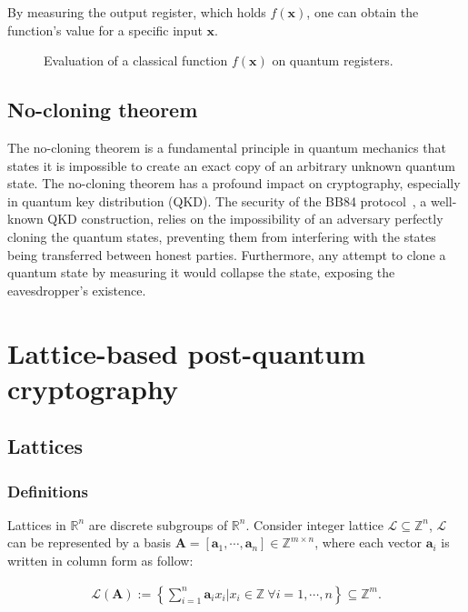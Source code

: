 \documentclass[cryptography,review,submit,pdftex,moreauthors,amsmath,amssymb,aps,strict]{Definitions/mdpi}
\newcommand{\peter}[1]{\textcolor{red}{#1}}
\begin{document}
By measuring the output register, which holds $f(\mathbf{x})$, one can obtain the function's value for a specific input $\mathbf{x}$. 
\begin{figure}[h]
    \center
    
    \caption{Evaluation of a classical function $f(\mathbf{x})$ on quantum registers.}
    \label{fig:quantum_parallelism}
\end{figure}



\subsection{No-cloning theorem}

The no-cloning theorem is a fundamental principle in quantum mechanics that states it is impossible to create an exact copy of an arbitrary unknown quantum state. The no-cloning theorem has a profound impact on cryptography, especially in quantum key distribution (QKD). The security of the BB84 protocol~\cite{BB84}, a well-known QKD construction, relies on the impossibility of an adversary perfectly cloning the quantum states, preventing them from interfering with the states being transferred between honest parties. Furthermore, any attempt to clone a quantum state by measuring it would collapse the state, exposing the eavesdropper's existence.


\section{Lattice-based post-quantum cryptography} \label{post-quantum-cryptography-pqc}

\subsection{Lattices}
\subsubsection{Definitions}\label{lattice}
\begin{Definition}
    Lattices in $\mathbb{R}^n$ are discrete subgroups of $\mathbb{R}^n$. Consider integer lattice $\mathcal{L}\subseteq \mathbb{Z}^n$, $\mathcal{L}$ can be represented by a basis $\mathbf{A}=[\mathbf{a}_1,\cdots,\mathbf{a}_n]\in\mathbb{Z}^{m\times n}$, where each vector $\mathbf{a}_i$ is written in column form as follow: 

\begin{align}
    \mathcal{L}(\mathbf{A}):=\left\{\sum_{i=1}^n\mathbf{a}_i x_i | x_i\in\mathbb{Z}~\forall i=1,\cdots,n \right\}\subseteq\mathbb{Z}^m.
\end{align}
\end{Definition}
\end{document}
